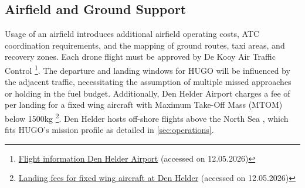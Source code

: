 \subsection{Airfield and Ground Support}
\label{subsec:ground_support}
Usage of an airfield introduces additional airfield operating costs, ATC coordination requirements, and the mapping of ground routes, taxi areas, and recovery zones. Each drone flight must be approved by De Kooy Air Traffic Control \footnote{\href{https://denhelderairport.nl/eng/flight-information/}{Flight information Den Helder Airport} (accessed on 12.05.2026)}. The departure and landing windows for HUGO will be influenced by the adjacent traffic, necessitating the assumption of multiple missed approaches or holding in the fuel budget. Additionally, Den Helder Airport charges a fee of  per landing for a fixed wing aircraft with Maximum Take-Off Mass (MTOM) below 1500kg \footnote{\href{https://denhelderairport.nl/wp-content/uploads/2026/01/2026-fixed-wing-miv-01-01-2026-2.pdf}{Landing fees for fixed wing aircraft at Den Helder} (accessed on 12.05.2026)}.
Den Helder hosts off-shore flights above the North Sea , which fits HUGO's mission profile as detailed in \autoref{sec:operations}. %




